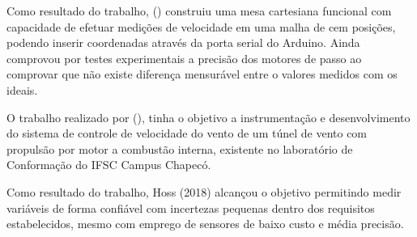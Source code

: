 Como resultado do trabalho, \citeauthor{ramos2018desenvolvimento} (\citeyear{ramos2018desenvolvimento}) construiu uma mesa cartesiana funcional com capacidade de efetuar medições 
de velocidade em uma malha de cem posições, podendo inserir coordenadas através da porta serial do Arduino. Ainda 
comprovou por testes experimentais a precisão dos motores de passo ao comprovar que não existe diferença mensurável 
entre o valores medidos com os ideais.

O trabalho realizado por \citeauthor{hoss2018implantaccao} (\citeyear{hoss2018implantaccao}), tinha o objetivo a instrumentação e desenvolvimento do sistema de controle de 
velocidade do vento de um túnel de vento com propulsão por motor a combustão interna, existente no laboratório de 
Conformação do IFSC Campus Chapecó.

Como resultado do trabalho, Hoss (2018) alcançou o objetivo permitindo medir variáveis de forma confiável com 
incertezas pequenas dentro dos requisitos estabelecidos, mesmo com emprego de sensores de baixo custo e média precisão.

